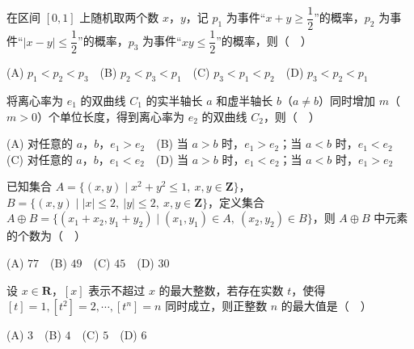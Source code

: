 \begin{question}
在区间 \([0,1]\) 上随机取两个数 \(x\)，\(y\)，记 \(p_1\) 为事件“\(x+y\geqslant\dfrac12\)”的概率，\(p_2\) 为事件“\(|x-y|\leqslant\dfrac12\)”的概率，\(p_3\) 为事件“\(xy\leqslant\dfrac12\)”的概率，则（　）

(A) \(p_1<p_2<p_3\)　(B) \(p_2<p_3<p_1\)　(C) \(p_3<p_1<p_2\)　(D) \(p_3<p_2<p_1\)

\end{question}
\begin{question}
将离心率为 \(e_1\) 的双曲线 \(C_1\) 的实半轴长 \(a\) 和虚半轴长 \(b\)（\(a\neq b\)）同时增加 \(m\)（\(m>0\)）个单位长度，得到离心率为 \(e_2\) 的双曲线 \(C_2\)，则（　）

(A) 对任意的 \(a\)，\(b\)，\(e_1>e_2\)　(B) 当 \(a>b\) 时，\(e_1>e_2\)；当 \(a<b\) 时，\(e_1<e_2\)　(C) 对任意的 \(a\)，\(b\)，\(e_1<e_2\)　(D) 当 \(a>b\) 时，\(e_1<e_2\)；当 \(a<b\) 时，\(e_1>e_2\)

\end{question}
\begin{question}
已知集合 \(A=\{(x,y)\mid x^2+y^2\leqslant1,\ x,y\in\mathbf{Z}\}\)，\(B=\{(x,y)\mid |x|\leqslant2,\ |y|\leqslant2,\ x,y\in\mathbf{Z}\}\)，定义集合 \(A\oplus B=\{(x_1+x_2,y_1+y_2)\mid (x_1,y_1)\in A,\ (x_2,y_2)\in B\}\)，则 \(A\oplus B\) 中元素的个数为（　）

(A) \(77\)　(B) \(49\)　(C) \(45\)　(D) \(30\)

\end{question}
\begin{question}
设 \(x\in\mathbf{R}\)，\([x]\) 表示不超过 \(x\) 的最大整数，若存在实数 \(t\)，使得 \([t]=1,[t^2]=2,\cdots,[t^n]=n\) 同时成立，则正整数 \(n\) 的最大值是（　）

(A) \(3\)　(B) \(4\)　(C) \(5\)　(D) \(6\)

\end{question}

